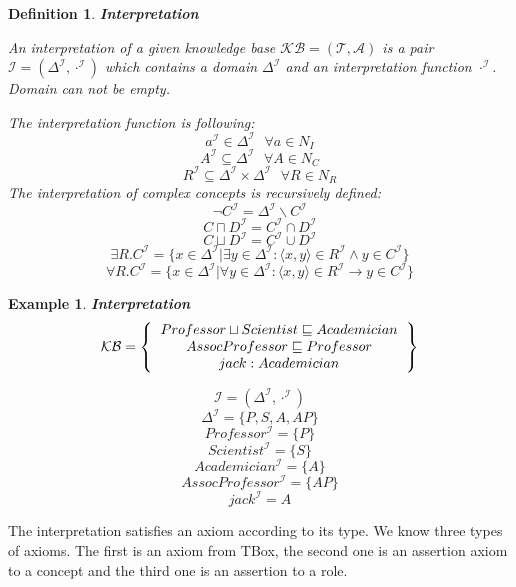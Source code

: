 \documentclass[12pt,a4paper]{article}
\newtheorem{definition}{Definition}[subsection]
\newtheorem{example}{Example}[subsection]
\begin{document}
\begin{definition}{\textbf{Interpretation}}

	An interpretation of a given knowledge base $\mathcal{KB} = (\mathcal{T}, \mathcal{A})$ is a pair $\mathcal{I} = (\Delta^{\mathcal{I}}, \cdot ^{\mathcal{I}})$ which contains a domain $\Delta^{\mathcal{I}}$ and an interpretation function $\cdot ^{\mathcal{I}}$.	
	Domain can not be empty.
		
	The interpretation function is following:
	\[ a^{\mathcal{I}} \in \Delta^{\mathcal{I}} \text{ } \forall a \in N_{I} \]
	\[ A^{\mathcal{I}} \subseteq \Delta^{\mathcal{I}} \text{ } \forall A \in N_{C} \]
	\[ R^{\mathcal{I}} \subseteq \Delta^{\mathcal{I}} \times \Delta^{\mathcal{I}} \text{ } \forall R \in N_{R} \]
	The interpretation of complex concepts is recursively defined:
	\[ \neg C^{\mathcal{I}} = \Delta^{\mathcal{I}} \backslash C^{\mathcal{I}} \]
	\[ C \sqcap D^{\mathcal{I}} = C^{\mathcal{I}} \cap D^{\mathcal{I}} \]
	\[ C \sqcup D^{\mathcal{I}} = C^{\mathcal{I}} \cup D^{\mathcal{I}} \]
	\[ \exists R.C^{\mathcal{I}} = \{ x \in \Delta^{\mathcal{I}} | \exists y \in \Delta^{\mathcal{I}} : \langle x,y \rangle \in R^{\mathcal{I}} \land y \in C^{\mathcal{I}} \} \]
	\[ \forall R.C^{\mathcal{I}} = \{ x \in \Delta^{\mathcal{I}} | \forall y \in \Delta^{\mathcal{I}} : \langle x,y \rangle \in R^{\mathcal{I}} \rightarrow y \in C^{\mathcal{I}} \} \]
\end{definition}

\begin{example}{\textbf{Interpretation}}
	\[ 
	\mathcal{KB} = \left\{
	\begin{tabular}{c c}
	$Professor \sqcup Scientist \sqsubseteq Academician$ \\
	$AssocProfessor \sqsubseteq Professor$ \\
	$jack : Academician$ \\
	\end{tabular}
	\right \}
	\]
	
	\[ \mathcal{I} = (\Delta ^{\mathcal{I}}, \cdot^{\mathcal{I}}) \]
	\[ \Delta ^{\mathcal{I}} = \{ P,S,A,AP \} \]
	\[ Professor^{\mathcal{I}} = \{P\} \]
	\[ Scientist^{\mathcal{I}} = \{S\} \]
	\[ Academician^{\mathcal{I}} = \{A\} \]
	\[ AssocProfessor^{\mathcal{I}} = \{AP\} \]
	\[ jack^{\mathcal{I}} = A \]
	
\end{example}

The interpretation satisfies an axiom according to its type. We know three types of axioms. The first is an axiom from TBox, the second one is an assertion axiom to a concept and the third one is an assertion to a role.
\end{document}
